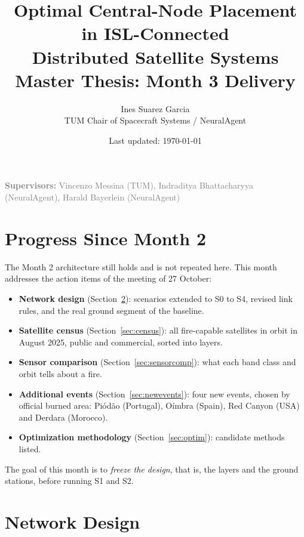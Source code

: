 \documentclass[11pt]{article}
\title{\textbf{Optimal Central-Node Placement in ISL-Connected \\ Distributed Satellite Systems} \\[0.3cm] \large Master Thesis: Month 3 Delivery}
\author{Ines Suarez Garcia \\ TUM Chair of Spacecraft Systems / NeuralAgent}
\date{Last updated: \today}
\begin{document}
\maketitle

\begin{center}
\textcolor{gray}{\textbf{Supervisors:} Vincenzo Messina (TUM), Indraditya Bhattacharyya (NeuralAgent), Harald Bayerlein (NeuralAgent)}
\end{center}

\vspace{0.5cm}

\section{Progress Since Month 2}

The Month 2 architecture still holds and is not repeated here. This month addresses the action items of the meeting of 27 October:

\begin{itemize}[leftmargin=1.2cm]
    \item \textbf{Network design} (Section~\ref{sec:runs}): scenarios extended to S0 to S4, revised link rules, and the real ground segment of the baseline.
    \item \textbf{Satellite census} (Section~\ref{sec:census}): all fire-capable satellites in orbit in August 2025, public and commercial, sorted into layers.
    \item \textbf{Sensor comparison} (Section~\ref{sec:sensorcomp}): what each band class and orbit tells about a fire.
    \item \textbf{Additional events} (Section~\ref{sec:newevents}): four new events, chosen by official burned area: Pi\'od\~ao (Portugal), O\'imbra (Spain), Red Canyon (USA) and Derdara (Morocco).
    \item \textbf{Optimization methodology} (Section~\ref{sec:optim}): candidate methods listed.
\end{itemize}

The goal of this month is to \emph{freeze the design}, that is, the layers and the ground stations, before running S1 and S2. 

\section{Network Design}\label{sec:runs}
\end{document}
